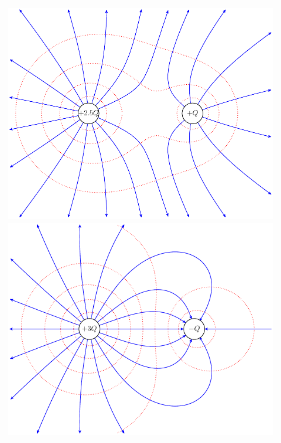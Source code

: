 \begin{figure}	
	\noindent\begin{minipage}{0.48\textwidth}
		\begin{center}	
			\includegraphics[width=7cm]{Q2p.pdf}
			\end{center}
		\end{minipage}\hfill
	\begin{minipage}{0.48\textwidth}
		\begin{center}
			\includegraphics[width=7cm]{Q4n.pdf}
		\end{center}
	\end{minipage}
\end{figure}

